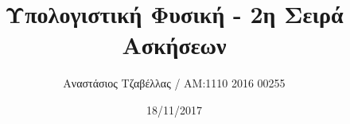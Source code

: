 \documentclass[11pt]{article}
\begin{document}
\title{Υπολογιστική Φυσική - 2η Σειρά Ασκήσεων}
\author{Αναστάσιος Τζαβέλλας / ΑΜ:1110 2016 00255}
\date{18/11/2017}
\maketitle














\end{document}
